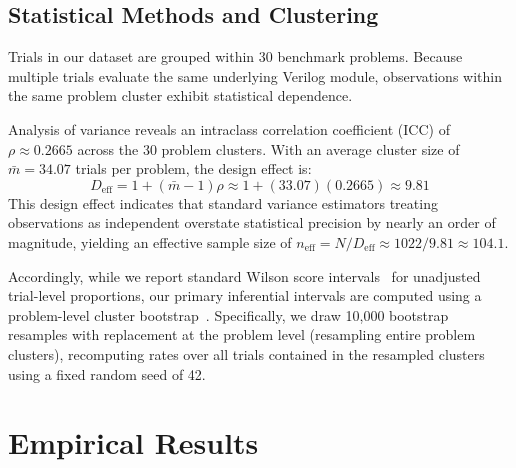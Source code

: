 \documentclass[conference]{IEEEtran}
\begin{document}
\subsection{Statistical Methods and Clustering}
Trials in our dataset are grouped within 30 benchmark problems. Because multiple trials evaluate the same underlying Verilog module, observations within the same problem cluster exhibit statistical dependence. 

Analysis of variance reveals an intraclass correlation coefficient (ICC) of $\rho \approx 0.2665$ across the 30 problem clusters. With an average cluster size of $\bar{m} = 34.07$ trials per problem, the design effect is:
\begin{equation}
D_{\text{eff}} = 1 + (\bar{m} - 1)\rho \approx 1 + (33.07)(0.2665) \approx 9.81
\end{equation}
This design effect indicates that standard variance estimators treating observations as independent overstate statistical precision by nearly an order of magnitude, yielding an effective sample size of $n_{\text{eff}} = N / D_{\text{eff}} \approx 1022 / 9.81 \approx 104.1$.

Accordingly, while we report standard Wilson score intervals~\cite{wilson1927probable} for unadjusted trial-level proportions, our primary inferential intervals are computed using a problem-level cluster bootstrap~\cite{cameron2015practitioner, efron1994introduction}. Specifically, we draw 10,000 bootstrap resamples with replacement at the problem level (resampling entire problem clusters), recomputing rates over all trials contained in the resampled clusters using a fixed random seed of 42.

\section{Empirical Results}
\end{document}
